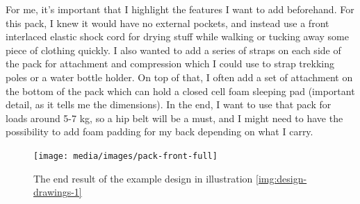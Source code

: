 For me, it's important that I highlight the features I want to add beforehand. For this pack, I knew it would have no external pockets, and instead use a front interlaced elastic shock cord for drying stuff while walking or tucking away some piece of clothing quickly. I also wanted to add a series of straps on each side of the pack for attachment and compression which I could use to strap trekking poles or a water bottle holder. On top of that, I often add a set of attachment on the bottom of the pack which can hold a closed cell foam sleeping pad (important detail, as it tells me the dimensions). In the end, I want to use that pack for loads around 5-7 kg, so a hip belt will be a must, and I might need to have the possibility to add foam padding for my back depending on what I carry.

\begin{figure}[H]
  \centering
  \texttt{[image: media/images/pack-front-full]}
  \caption{The end result of the example design in illustration \ref{img:design-drawings-1}}
  \label{img:pack-front-full-intro}
\end{figure}
